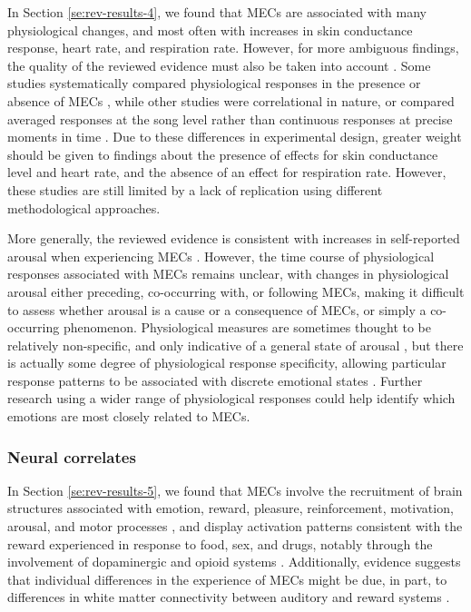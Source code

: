 In Section \ref{se:rev-results-4}, we found that MECs are associated with many physiological changes, and most often with increases in skin conductance response, heart rate, and respiration rate. However, for more ambiguous findings, the quality of the reviewed evidence must also be taken into account \parencite{koelsch2015}. Some studies systematically compared physiological responses in the presence or absence of MECs \parencite[e.g.,][]{benedek2011, craig2005, grewe2009a, grewe2011, guhn2007, masherrero2014, mori2017, salimpoor2009, sumpf2015}, while other studies were correlational in nature, or compared averaged responses at the song level rather than continuous responses at precise moments in time \parencite[e.g.,][]{baltes2011, carr2016, jaimovich2013, rickard2004, salimpoor2011, schafer2011}. Due to these differences in experimental design, greater weight should be given to findings about the presence of effects for skin conductance level and heart rate, and the absence of an effect for respiration rate. However, these studies are still limited by a lack of replication using different methodological approaches.

More generally, the reviewed evidence is consistent with increases in self-reported arousal when experiencing MECs \parencite{baltes2011, carr2016, grewe2009a, mori2015, mori2017, sumpf2015}. However, the time course of physiological responses associated with MECs remains unclear, with changes in physiological arousal either preceding, co-occurring with, or following MECs, making it difficult to assess whether arousal is a cause or a consequence of MECs, or simply a co-occurring phenomenon. Physiological measures are sometimes thought to be relatively non-specific, and only indicative of a general state of arousal \parencite{larsen2008, panksepp2002}, but there is actually some degree of physiological response specificity, allowing particular response patterns to be associated with discrete emotional states \parencite{hodges2016, kreibig2010}. Further research using a wider range of physiological responses could help identify which emotions are most closely related to MECs.

\subsubsection{Neural correlates}

In Section \ref{se:rev-results-5}, we found that MECs involve the recruitment of brain structures associated with emotion, reward, pleasure, reinforcement, motivation, arousal, and motor processes \parencite{blood2001, brattico2009, chanda2013, vuust2010}, and display activation patterns consistent with the reward experienced in response to food, sex, and drugs, notably through the involvement of dopaminergic and opioid systems \parencite{blood2001, chanda2013, mallik2017, zatorre2003}. Additionally, evidence suggests that individual differences in the experience of MECs might be due, in part, to differences in white matter connectivity between auditory and reward systems \parencite{brattico2019a, hernandez2019, loui2017, sachs2016}.

